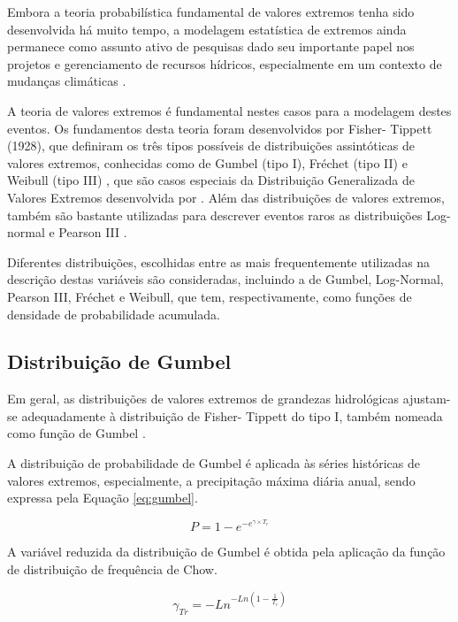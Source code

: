 Embora a teoria probabilística fundamental de valores extremos tenha sido desenvolvida há muito tempo, a modelagem estatística de extremos ainda permanece como assunto ativo de pesquisas dado seu importante papel nos projetos e gerenciamento de recursos hídricos, especialmente em um contexto de mudanças climáticas \cite{extremes}.

A teoria de valores extremos é fundamental nestes casos para a modelagem destes eventos. Os fundamentos desta teoria foram desenvolvidos por Fisher- Tippett (1928), que definiram os três tipos possíveis de distribuições assintóticas de valores extremos, conhecidas como de Gumbel (tipo I), Fréchet (tipo II) e Weibull (tipo III) \cite{ejgumbel}, que são casos especiais da Distribuição Generalizada de Valores Extremos desenvolvida por . Além das distribuições de valores extremos, também são bastante utilizadas para descrever eventos raros as distribuições Log-normal e Pearson III \cite{sev}.

Diferentes distribuições, escolhidas entre as mais frequentemente utilizadas na descrição destas variáveis são consideradas, incluindo a de Gumbel, Log-Normal, Pearson III, Fréchet e Weibull, que tem, respectivamente, como funções de densidade de probabilidade acumulada.

\subsection{Distribuição de Gumbel}

Em geral, as distribuições de valores extremos de grandezas hidrológicas ajustam-se adequadamente à distribuição de Fisher- Tippett do tipo I, também nomeada como função de Gumbel \cite{hidro-aplicada}.

A distribuição de probabilidade de Gumbel é aplicada às séries históricas de valores extremos, especialmente, a precipitação máxima diária anual, sendo expressa pela Equação \ref{eq:gumbel}.

\begin{equation}
\label{eq:gumbel}
    P = 1 - e^{-e^{\gamma \times T_r}}
\end{equation}

A variável reduzida da distribuição de Gumbel é obtida pela aplicação da função de distribuição de frequência de Chow.

\begin{equation}
    \gamma_{Tr} = - Ln^{-Ln \left( 1 - \frac{1}{T_r} \right)}
\end{equation}

